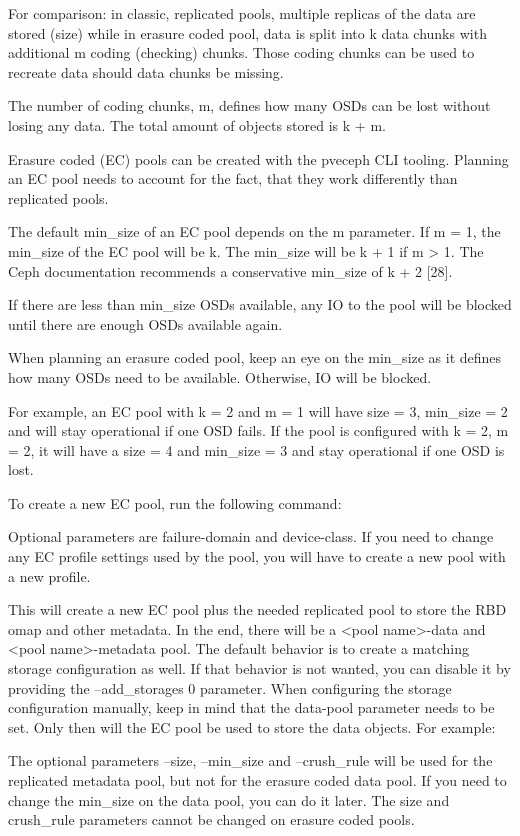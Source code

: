 For comparison: in classic, replicated pools, multiple replicas of the data are stored (size) while in erasure coded pool, data is split into k data chunks with additional m coding (checking) chunks. Those coding chunks can be used to recreate data should data chunks be missing.

The number of coding chunks, m, defines how many OSDs can be lost without losing any data. The total amount of objects stored is k + m.

Erasure coded (EC) pools can be created with the pveceph CLI tooling. Planning an EC pool needs to account for the fact, that they work differently than replicated pools.

The default min_size of an EC pool depends on the m parameter. If m = 1, the min_size of the EC pool will be k. The min_size will be k + 1 if m > 1. The Ceph documentation recommends a conservative min_size of k + 2 [28].

If there are less than min_size OSDs available, any IO to the pool will be blocked until there are enough OSDs available again.

When planning an erasure coded pool, keep an eye on the min_size as it defines how many OSDs need to be available. Otherwise, IO will be blocked.

For example, an EC pool with k = 2 and m = 1 will have size = 3, min_size = 2 and will stay operational if one OSD fails. If the pool is configured with k = 2, m = 2, it will have a size = 4 and min_size = 3 and stay operational if one OSD is lost.

To create a new EC pool, run the following command:

Optional parameters are failure-domain and device-class. If you need to change any EC profile settings used by the pool, you will have to create a new pool with a new profile.

This will create a new EC pool plus the needed replicated pool to store the RBD omap and other metadata. In the end, there will be a <pool name>-data and <pool name>-metadata pool. The default behavior is to create a matching storage configuration as well. If that behavior is not wanted, you can disable it by providing the --add_storages 0 parameter. When configuring the storage configuration manually, keep in mind that the data-pool parameter needs to be set. Only then will the EC pool be used to store the data objects. For example:

The optional parameters --size, --min_size and --crush_rule will be used for the replicated metadata pool, but not for the erasure coded data pool. If you need to change the min_size on the data pool, you can do it later. The size and crush_rule parameters cannot be changed on erasure coded pools.

